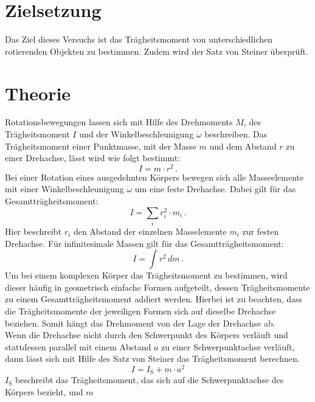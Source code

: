 \section{Zielsetzung}
\label{sec:Zielsetzung}
Das Ziel dieses Versuchs ist das Trägheitsmoment von unterschiedlichen rotierenden Objekten zu bestimmen. 
Zudem wird der Satz von Steiner überprüft.
%
\section{Theorie}
\label{sec:Theorie}
Rotationsbewegungen lassen sich mit Hilfe des Drehmoments $M$, des Trägheitsmoment $I$ und 
der Winkelbeschleunigung $\dot{\omega}$ beschreiben. Das Trägheitsmoment einer Punktmasse, 
mit der Masse $m$ und dem Abstand $r$ zu einer Drehachse, lässt wird wie folgt bestimmt:
\begin{equation}
    I = m \cdot r^{2}\,.
    \label{eqn:TragheitPunktmasse}
\end{equation}
%
Bei einer Rotation eines ausgedehnten Körpers bewegen sich alle Masseelemente mit einer 
Winkelbeschleunigung $\dot{\omega}$ um eine feste Drehachse. Dabei gilt für das Gesamtträgheitsmoment:
\begin{equation}
    I = \sum_{i} r_{i}^{2} \cdot m_{i}\, .
    \label{eqn:GesamttragheitSumme}
\end{equation}
%
Hier beschreibt $r_{i}$ den Abstand der einzelnen Masselemente $m_{i}$ zur festen Drehachse.
Für infinitesimale Massen gilt für das Gesamtträgheitsmoment:
\begin{equation}
    I = \int r^{2}\,dm \,.
    \label{eqn:GesamttragheitIntegral}
\end{equation}
%
Um bei einem komplexen Körper das Trägheitsmoment zu bestimmen, wird dieser häufig in 
geometrisch einfache Formen aufgeteilt, dessen Trägheitsmomente zu einem Gesamtträgheitsmoment 
addiert werden. Hierbei ist zu beachten, dass die Trägheitsmomente der jeweiligen Formen sich
auf dieselbe Drehachse beziehen. Somit hängt das Drehmoment von der Lage der Drehachse ab. \\
%
Wenn die Drehachse nicht durch den Schwerpunkt des Körpers verläuft und stattdessen parallel 
mit einem Abstand $a$ zu einer Schwerpunktachse verläuft, dann lässt sich mit Hilfe des Satz von Steiner
das Trägheitsmoment berechnen.
\begin{equation}
    I = I_{\text{S}} + m \cdot a^{2}
    \label{eqn:SatzVonSteiner}
\end{equation}
%
$I_{\text{S}}$ beschreibt das Trägheitsmoment, das sich auf die Schwerpunktachse des Körpers bezieht, und $m$
